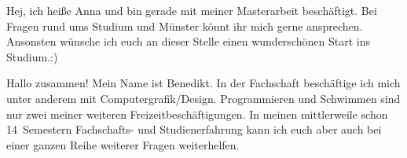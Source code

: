\begin{multicols}{2}
{
Hej, ich heiße Anna und bin gerade mit meiner Masterarbeit beschäftigt. 
Bei Fragen rund ums Studium und Münster könnt ihr mich gerne ansprechen. 
Ansonsten wünsche ich euch an dieser Stelle einen wunderschönen Start ins Studium.:)
}

{
Hallo zusammen! Mein Name ist Benedikt. In der Fachschaft beschäftige ich mich unter anderem mit Computergrafik/Design. 
Programmieren und Schwimmen sind nur zwei meiner weiteren Freizeitbeschäftigungen. 
In meinen mittlerweile schon 14~Semestern Fachschafts- und Studienerfahrung kann ich euch aber auch bei einer ganzen Reihe weiterer Fragen weiterhelfen.
}

\vspace{-0.5cm}


\end{multicols}
